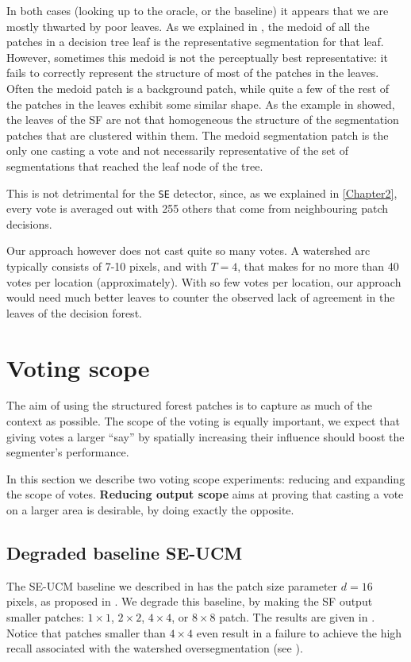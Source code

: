 In both cases (looking up to the oracle, or the baseline) it appears that we are mostly thwarted by poor leaves. As we explained in , the medoid of all the patches in a decision tree leaf is the representative segmentation for that leaf. However, sometimes this medoid is not the perceptually best representative: it fails to correctly represent the structure of most of the patches in the leaves. Often the medoid patch is a background patch, while quite a few of the rest of the patches in the leaves exhibit some similar shape. As the example in  showed, the leaves of the SF are not that homogeneous \wrt the structure of the segmentation patches that are clustered within them. 
The medoid segmentation patch is the only one casting a vote and not necessarily representative of the set of segmentations that reached the leaf node of the tree.

This is not detrimental for the {\tt SE} detector, since, as we explained %
in \cref{Chapter2}, every vote is averaged out with 255 others %
that come from neighbouring patch decisions. 

Our approach however does not cast quite so many votes. A watershed arc typically consists of 7-10 pixels, and with $T=4$, that makes %
for no more than 40 votes per location (approximately). 
With so few votes per location, our approach would need much better leaves to counter the observed lack of %
agreement in the leaves of the decision forest.


\section{Voting scope}
The aim of using the structured forest patches is to capture as much of the context as possible. The scope of the voting is equally important, we expect that giving votes a larger ``say'' by spatially increasing their influence should boost the segmenter's performance.

In this section we describe two voting scope experiments: reducing and expanding the scope of votes. \textbf{Reducing output scope} %
aims at proving that casting a vote on a larger area is desirable, by doing exactly the opposite.

\subsection{Degraded baseline SE-UCM}
The SE-UCM baseline we described in  has the patch size parameter $d=16$ pixels, as proposed in \cite{DollarICCV13edges}. We degrade this baseline, by making the SF output smaller patches: $1\times1$, $2\times2$, $4\times4$, or $8\times8$ patch. The results are given in . Notice that patches smaller than $4\times 4$ even result in a failure to achieve the high recall associated with the watershed oversegmentation (see ).

